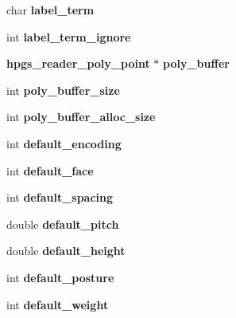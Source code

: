 \begin{Indent}{\bf }\par
\begin{CompactItemize}
\item 
char {\bf label\_\-term}
\item 
int \textbf{label\_\-term\_\-ignore}\label{structhpgs__reader__st_9e54f7011e6a35f47903a8e132f1212a}

\end{CompactItemize}
\end{Indent}
\begin{Indent}{\bf }\par
\begin{CompactItemize}
\item 
{\bf hpgs\_\-reader\_\-poly\_\-point} $\ast$ {\bf poly\_\-buffer}
\item 
int \textbf{poly\_\-buffer\_\-size}\label{structhpgs__reader__st_23291d784cf75b1b3d1783182187056b}

\item 
int \textbf{poly\_\-buffer\_\-alloc\_\-size}\label{structhpgs__reader__st_92c9024e53ba5a600ffe4bd151d580d0}

\end{CompactItemize}
\end{Indent}
\begin{Indent}{\bf }\par
\begin{CompactItemize}
\item 
int {\bf default\_\-encoding}
\item 
int \textbf{default\_\-face}\label{structhpgs__reader__st_1567ffd38e5fefe6193fa7dbd68b0214}

\item 
int \textbf{default\_\-spacing}\label{structhpgs__reader__st_df010575fe9deb40304f19897e14823a}

\item 
double \textbf{default\_\-pitch}\label{structhpgs__reader__st_c9e0c057f334d74a0ed547082c82a858}

\item 
double \textbf{default\_\-height}\label{structhpgs__reader__st_d33323846ca9017ec569745d305fdfb3}

\item 
int \textbf{default\_\-posture}\label{structhpgs__reader__st_b1723b82575818b75322dcfa6569fd1e}

\item 
int \textbf{default\_\-weight}\label{structhpgs__reader__st_9128f39109a96e024bcc5325479c0c0c}

\end{CompactItemize}
\end{Indent}
